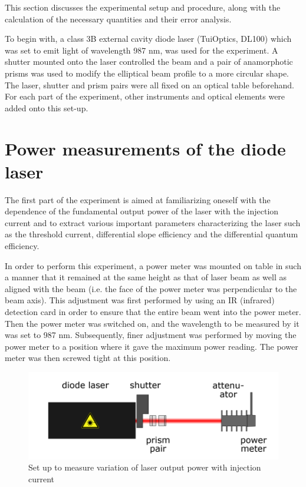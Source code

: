 This section discusses the experimental setup and procedure, along with the calculation of the necessary quantities and their error analysis. 

To begin with, a class 3B external cavity diode laser (TuiOptics, DL100) which was set to emit light of wavelength 987 nm, was used for the experiment. A shutter mounted onto the laser controlled the beam and a pair of anamorphotic prisms was used to modify the elliptical beam profile to a more circular shape. The laser, shutter and prism pairs were all fixed on an optical table beforehand. For each part of the experiment, other instruments and optical elements were added onto this set-up.

\section{Power measurements of the diode laser}
The first part of the experiment is aimed at familiarizing oneself with the dependence of the fundamental output power of the laser with the injection current and to extract various important parameters characterizing the laser such as the threshold current, differential slope efficiency and the differential quantum efficiency. 

In order to perform this experiment, a power meter was mounted on table in such a manner that it remained at the same height as that of laser beam as well as aligned with the beam (i.e. the face of the power meter was perpendicular to the beam axis). This adjustment was first performed by using an IR (infrared) detection card in order to ensure that the entire beam went into the power meter. Then the power meter was switched on, and the wavelength to be measured by it was set to 987 nm. Subsequently, finer adjustment was performed by moving the power meter to a position where it gave the maximum power reading. The power meter was then screwed tight at this position.

\begin{figure}[H]
\includegraphics[scale=0.4]{./imagesandplots/pic1.png}
\centering
\caption{Set up to measure variation of laser output power with injection current \cite{UB}}
\label{figexpt1}
\end{figure}

